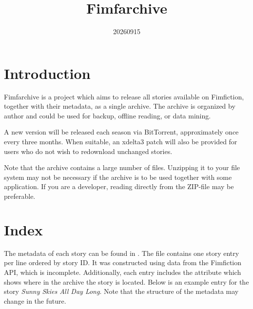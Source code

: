 \documentclass[hidelinks,a4paper,12pt]{article}
\begin{document}
\title{Fimfarchive}
\date{20260915}

\maketitle
\newpage
\tableofcontents
\newpage

\section{Introduction} \label{sec:introduction}

Fimfarchive is a project which aims to release all stories available on Fimfiction, together with their metadata, as a single archive. The archive is organized by author and could be used for backup, offline reading, or data mining.

A new version will be released each season via BitTorrent, approximately once every three months. When suitable, an xdelta3 patch will also be provided for users who do not wish to redownload unchanged stories.

Note that the archive contains a large number of files. Unzipping it to your file system may not be necessary if the archive is to be used together with some application. If you are a developer, reading directly from the ZIP-file may be preferable.


\section{Index} \label{sec:index}

The metadata of each story can be found in . The file contains one story entry per line ordered by story ID. It was constructed using data from the Fimfiction API, which is incomplete. Additionally, each entry includes the attribute  which shows where in the archive the story is located. Below is an example entry for the story \emph{Sunny Skies All Day Long}. Note that the structure of the metadata may change in the future.
\end{document}
